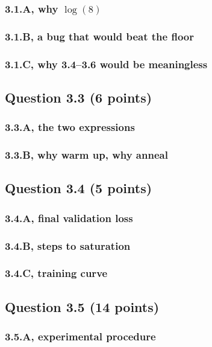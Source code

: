 \documentclass[11pt]{article}
\begin{document}
\subsubsection*{3.1.A, why $\log(8)$}
\subsubsection*{3.1.B, a bug that would beat the floor}
\subsubsection*{3.1.C, why 3.4–3.6 would be meaningless}

\subsection*{Question 3.3 (6 points)}
\subsubsection*{3.3.A, the two expressions}
\subsubsection*{3.3.B, why warm up, why anneal}

\subsection*{Question 3.4 (5 points)}
\subsubsection*{3.4.A, final validation loss}
\subsubsection*{3.4.B, steps to saturation}
\subsubsection*{3.4.C, training curve}

\subsection*{Question 3.5 (14 points)}
%
%
\subsubsection*{3.5.A, experimental procedure}
\end{document}
